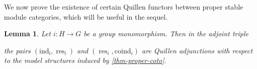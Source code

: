 \documentclass{amsart}
\newcommand{\GD}[1]{{\color{ForestGreen} G: [#1]}}
\newcommand{\res}{\operatorname{res}\nolimits}
\newcommand{\ind}{\operatorname{ind}\nolimits}
\def \A{{\mathcal A}}
\def \B{{\mathcal B}}
\def \F{{\mathcal F}}
\DeclareMathOperator{\Mod}{Mod}
\numberwithin{equation}{section}%
\newtheorem{lemma}[equation]{Lemma}
\theoremstyle{remark}
\newtheorem{recollection}[equation]{Recollection}
\begin{document}
We now prove the existence of certain Quillen functors between proper stable module categories, which will be useful in the sequel.




\begin{lemma}\label{lemma-Quillen-adj}
    Let $i\colon H\to G$ be a group monomorphism. Then in the adjoint triple  
    \begin{center}
    \end{center}
the pairs $(\mathrm{ind_i,\res_i})$ and  $(\res_i,\mathrm{coind}_i)$ are Quillen adjunctions with respect to the model structures induced by \cref{thm-proper-coto}. 
\end{lemma}
\end{document}
